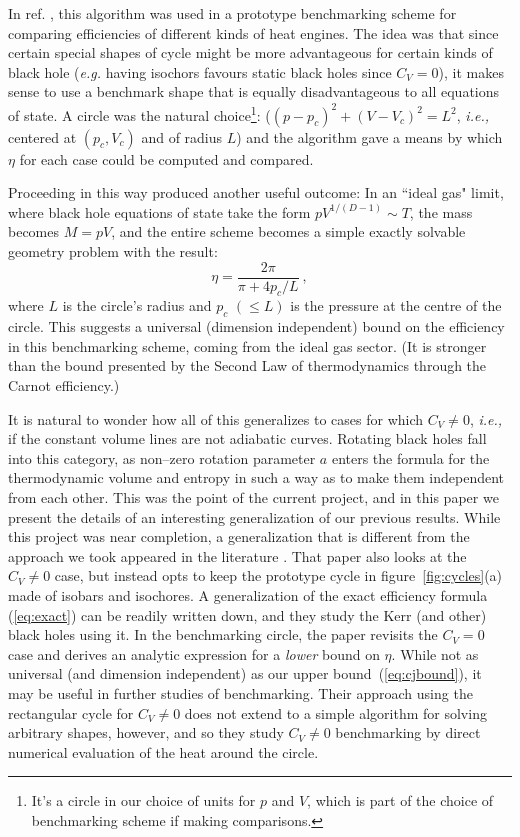 \documentclass[letterpaper,11pt]{article}
\newcommand{\reef}[1]{(\ref{#1})}
\begin{document}
In ref. \cite{Chakraborty:2016ssb}, this algorithm was used in a  prototype benchmarking scheme for comparing efficiencies of different kinds of heat engines. The idea was that since certain special shapes of cycle might be more advantageous  for  certain kinds of black hole ({\it e.g.} having isochors favours static black holes since $C_V=0$), it makes sense to use a benchmark shape that is equally disadvantageous to all equations of state. A circle was the natural choice\footnote{It's a circle in our choice of units for $p$ and $V$, which is part of the choice of benchmarking scheme if making comparisons.}: ($(p-p_c)^2+(V-V_c)^2=L^2$, {\it i.e.,} centered at $(p_c,V_c)$ and of radius $L$) and the algorithm gave a means by which $\eta$ for each case could be computed and compared. 

Proceeding in this way produced another useful outcome: In an ``ideal gas" limit, where black hole equations of state take the form $p V^{1/(D-1)}\sim T$, the mass becomes $M=pV$, and the entire scheme becomes a simple exactly solvable geometry problem with the result:
\begin{equation}
\label{eq:cjbound}
\eta=\frac{2\pi}{\pi+4p_c/L}\ ,
\end{equation}
where  $L$ is the circle's radius and $p_c$ $(\le L)$ is the pressure at the centre of the circle. This suggests a universal (dimension independent) bound on the efficiency in this benchmarking scheme, coming from the ideal gas sector. (It is stronger than the bound presented by the Second Law of thermodynamics through the Carnot efficiency.)

It is natural to wonder how all of this generalizes to cases for which $C_V\neq0$, {\it i.e.,} if the constant volume lines are not adiabatic curves. Rotating black holes fall into this category, as non--zero rotation parameter $a$ enters the formula for the thermodynamic volume and entropy in such a way as to make them independent from each other. This was the point of the current project, and in this paper we present the details of an interesting generalization of our previous results. While this project was near completion, a   generalization that is different from the approach we took appeared in the literature \cite{Hennigar:2017apu}. That paper also looks at the $C_V\neq0$ case, but instead opts to keep the prototype cycle in figure~\ref{fig:cycles}(a) made of isobars and isochores. A generalization of the exact efficiency formula \reef{eq:exact} can be readily written down, and they study  the Kerr (and other) black holes using it. In the benchmarking circle, the paper revisits the $C_V=0$ case and derives an analytic expression for a {\it lower} bound  on $\eta$. While not as universal (and dimension independent) as our upper bound~\reef{eq:cjbound}, it may be useful  in further studies of benchmarking. Their approach using the rectangular cycle for $C_V\neq0$ does not extend to a simple algorithm for solving arbitrary shapes, however, and so they study $C_V\neq0$ benchmarking by direct numerical evaluation of the heat around the circle.
\end{document}
